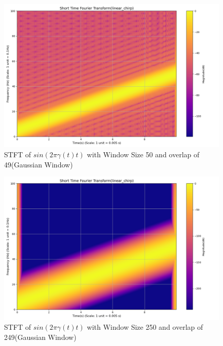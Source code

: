 \documentclass[12pt,a4paper,onecolumn]{exam}
\begin{document}
\begin{solution}
\begin{itemize}
\begin{itemize}
        \begin{figure}[H]
        \centering
        \includegraphics[scale = 0.35]{Gau_Win_linear_chirp_1_50.0.png}
        \caption{STFT of $sin(2\pi\gamma(t)t)$ with Window Size 50 and overlap of 49(Gaussian Window)}
        \label{fig:19}
        \end{figure}

        \begin{figure}[H]
        \centering
        \includegraphics[scale = 0.35 ]{Gau_Win_linear_chirp_1_250.0.png}
        \caption{STFT of $sin(2\pi\gamma(t)t)$ with Window Size 250 and overlap of 249(Gaussian Window)}
        \label{fig:20}
        \end{figure}


\end{itemize}
\end{itemize}
\end{solution}
\end{document}
